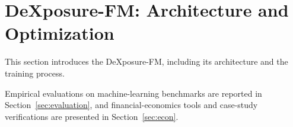 \section{DeXposure-FM: Architecture and Optimization}

This section introduces the DeXposure-FM, including its architecture and the training process. %





\noindent Empirical evaluations on machine-learning benchmarks are reported in Section~\ref{sec:evaluation}, and financial-economics tools and case-study verifications are presented in Section~\ref{sec:econ}.

